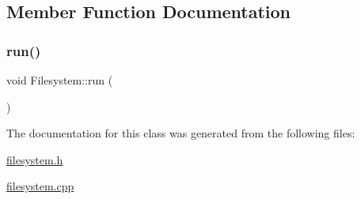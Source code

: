 \subsection{Member Function Documentation}
\mbox{\label{class_filesystem_a373c34da491ec8d269cbc18d52a1ad79}} 
\subsubsection{\texorpdfstring{run()}{run()}}
{\footnotesize\ttfamily void Filesystem\+::run (\begin{DoxyParamCaption}{ }\end{DoxyParamCaption})}



The documentation for this class was generated from the following files\+:\begin{DoxyCompactItemize}
\item 
\hyperlink{filesystem_8h}{filesystem.\+h}\item 
\hyperlink{filesystem_8cpp}{filesystem.\+cpp}\end{DoxyCompactItemize}
